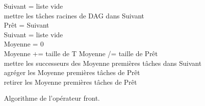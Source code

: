 \begin{algorithm}
  {\sc Suivant} = liste vide \\
  mettre les tâches racines de DAG dans {\sc Suivant} \\
   {
    {\sc Prêt} = {\sc Suivant} \\
    {\sc Suivant} = liste vide \\
    {\sc Moyenne} = 0 \\
     {
      {\sc Moyenne } += taille de {\sc T}
    }
    {\sc Moyenne} /= taille de {\sc Prêt} \\

     {
      mettre les successeurs des {\sc Moyenne} premières tâches dans {\sc Suivant} \\
      agréger les {\sc Moyenne} premières tâches de {\sc Prêt} \\
      retirer les {\sc Moyenne} premières tâches de {\sc Prêt}
    }
  }
  \caption{Algorithme de l'opérateur front.}
  \label{algo:algo_F}
\end{algorithm}
